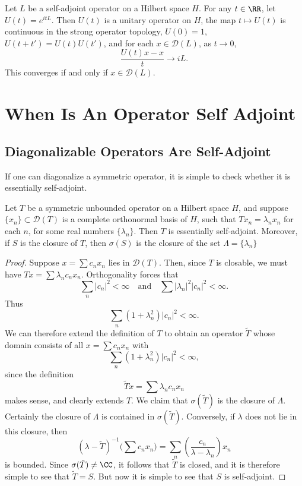 \begin{theorem}
    Let $L$ be a self-adjoint operator on a Hilbert space $H$. For any $t \in \RR$, let $U(t) = e^{itL}$. Then $U(t)$ is a unitary operator on $H$, the map $t \mapsto U(t)$ is continuous in the strong operator topology, $U(0) = 1$, $U(t + t') = U(t) U(t')$, and for each $x \in \mathcal{D}(L)$, as $t \to 0$,
    \[ \frac{U(t) x - x}{t} \to i L. \]
    This converges if and only if $x \in \mathcal{D}(L)$.
\end{theorem}








\section{When Is An Operator Self Adjoint}

\subsection{Diagonalizable Operators Are Self-Adjoint}

If one can diagonalize a symmetric operator, it is simple to check whether it is essentially self-adjoint.

\begin{theorem}
    Let $T$ be a symmetric unbounded operator on a Hilbert space $H$, and suppose $\{ x_n \} \subset \mathcal{D}(T)$ is a complete orthonormal basis of $H$, such that $Tx_n = \lambda_n x_n$ for each $n$, for some real numbers $\{ \lambda_n \}$. Then $T$ is essentially self-adjoint. Moreover, if $S$ is the closure of $T$, then $\sigma(S)$ is the closure of the set $\Lambda = \{ \lambda_n \}$
\end{theorem}
\begin{proof}
    Suppose $x = \sum c_n x_n$ lies in $\mathcal{D}(T)$. Then, since $T$ is closable, we must have $Tx = \sum \lambda_n c_n x_n$. Orthogonality forces that
    \[ \sum_n |c_n|^2 < \infty \quad\text{and}\quad \sum |\lambda_n|^2 |c_n|^2 < \infty. \]
    Thus
    \[ \sum_n (1 + \lambda_n^2) |c_n|^2 < \infty. \]
    We can therefore extend the definition of $T$ to obtain an operator $\tilde{T}$ whose domain consists of all $x = \sum c_n x_n$ with
    \[ \sum_n (1 + \lambda_n^2) |c_n|^2 < \infty, \]
    since the definition
    \[ \tilde{T} x = \sum \lambda_n c_n x_n \]
    makes sense, and clearly extends $T$. We claim that $\sigma(\tilde{T})$ is the closure of $\Lambda$. Certainly the closure of $\Lambda$ is contained in $\sigma(\tilde{T})$. Conversely, if $\lambda$ does not lie in this closure, then
    \[ (\lambda - \tilde{T})^{-1} \Big( \sum c_n x_n \Big) = \sum_n \left( \frac{c_n}{\lambda - \lambda_n} \right) x_n \]
    is bounded. Since $\sigma(\tilde{T}) \neq \CC$, it follows that $\tilde{T}$ is closed, and it is therefore simple to see that $\tilde{T} = S$. But now it is simple to see that $S$ is self-adjoint.
\end{proof}

